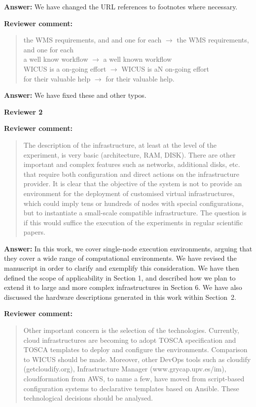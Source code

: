 \documentclass{letter}
\newenvironment{review}%
{\textbf{Reviewer comment:}\begin{quote}}%
{\end{quote}}%
\newcommand{\answer}[1]{%
      \textbf{Answer:} #1}
\newcommand{\revised}[1]{\emph{#1}\color{black}}
\begin{document}
\begin{letter}{}
\answer{We have changed the URL references to footnotes where necessary.}


\begin{review}
the WMS requirements, and and one for each $\rightarrow$ the WMS requirements, and one for each \\
a well know workflow $\rightarrow$ a well known workflow \\
WICUS is a on-going effort $\rightarrow$ WICUS is aN on-going effort \\
for their valuable help $\rightarrow$ for their valuable help.
\end{review}

\answer{We have fixed these and other typos.}




\newpage

%
%
\textbf{Reviewer 2}


\begin{review}
The description of the infrastructure, at least at the level of the experiment, is very basic (architecture, RAM, DISK). There are other important and complex features such as networks, additional disks, etc. that require both configuration and direct actions on the infrastructure provider. It is clear that the objective of the system is not to provide an environment for the deployment of customised virtual infrastructures, which could imply tens or hundreds of nodes with special configurations, but to instantiate a small-scale compatible infrastructure. The question is if this would suffice the execution of the experiments in regular scientific papers.
\end{review}

\answer{In this work, we cover single-node execution environments, arguing that they cover a wide range of computational environments. We have revised the manuscript in order to clarify and exemplify this consideration. We have then defined the scope of applicability in Section 1, and described how we plan to extend it to large and more complex infrastructures in Section 6. We have also discussed the hardware descriptions generated in this work within Section~2.}

\revised{}


\begin{review}
Other important concern is the selection of the technologies. Currently, cloud infrastructures are becoming to adopt TOSCA specification and TOSCA templates to deploy and configure the environments. Comparison to WICUS should be made. Moreover, other DevOps tools such as cloudify (getcloudify.org), Infrastructure Manager (www.grycap.upv.es/im), cloudformation from AWS, to name a few, have moved from script-based configuration systems to declarative templates based on Ansible. These technological decisions should be analysed.
\end{review}


\end{letter}
\end{document}
